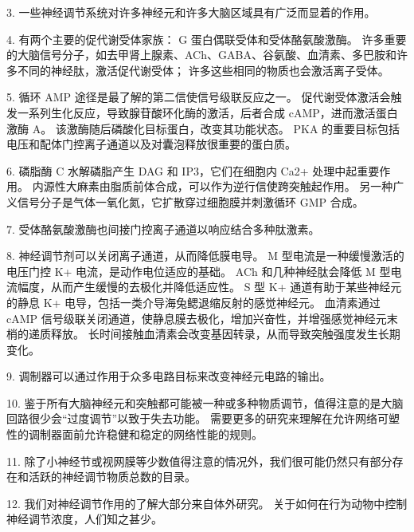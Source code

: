 3. 一些神经调节系统对许多神经元和许多大脑区域具有广泛而显着的作用。


4. 有两个主要的促代谢受体家族：
G 蛋白偶联受体和受体酪氨酸激酶。 
许多重要的大脑信号分子，如去甲肾上腺素、ACh、GABA、谷氨酸、血清素、多巴胺和许多不同的神经肽，激活促代谢受体；
许多这些相同的物质也会激活离子受体。 


5. 循环 AMP 途径是最了解的第二信使信号级联反应之一。
促代谢受体激活会触发一系列生化反应，导致腺苷酸环化酶的激活，后者合成 cAMP，进而激活蛋白激酶 A。
该激酶随后磷酸化目标蛋白，改变其功能状态。
PKA 的重要目标包括电压和配体门控离子通道以及对囊泡释放很重要的蛋白质。 


6. 磷脂酶 C 水解磷脂产生 DAG 和 IP3，它们在细胞内 Ca2+ 处理中起重要作用。
内源性大麻素由脂质前体合成，可以作为逆行信使跨突触起作用。
另一种广义信号分子是气体一氧化氮，它扩散穿过细胞膜并刺激循环 GMP 合成。


7. 受体酪氨酸激酶也间接门控离子通道以响应结合多种肽激素。 


8. 神经调节剂可以关闭离子通道，从而降低膜电导。
M 型电流是一种缓慢激活的电压门控 K+ 电流，是动作电位适应的基础。
ACh 和几种神经肽会降低 M 型电流幅度，从而产生缓慢的去极化并降低适应性。
S 型 K+ 通道有助于某些神经元的静息 K+ 电导，包括一类介导海兔鳃退缩反射的感觉神经元。
血清素通过 cAMP 信号级联关闭通道，使静息膜去极化，增加兴奋性，并增强感觉神经元末梢的递质释放。
长时间接触血清素会改变基因转录，从而导致突触强度发生长期变化。 


9. 调制器可以通过作用于众多电路目标来改变神经元电路的输出。 


10. 鉴于所有大脑神经元和突触都可能被一种或多种物质调节，值得注意的是大脑回路很少会“过度调节”以致于失去功能。
需要更多的研究来理解在允许网络可塑性的调制器面前允许稳健和稳定的网络性能的规则。


11. 除了小神经节或视网膜等少数值得注意的情况外，我们很可能仍然只有部分存在和活跃的神经调节物质总数的目录。


12. 我们对神经调节作用的了解大部分来自体外研究。 关于如何在行为动物中控制神经调节浓度，人们知之甚少。






